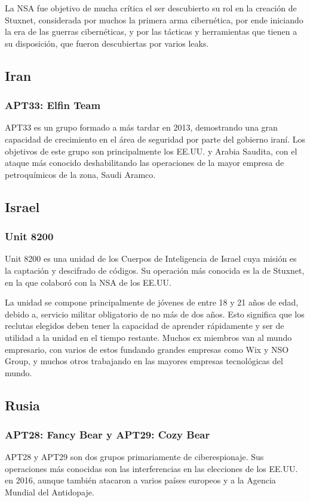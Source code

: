 \documentclass{article}
\begin{document}
La NSA fue objetivo de mucha crítica el ser descubierto su rol en la creación de Stuxnet, considerada por muchos la primera arma cibernética, por ende iniciando la era de las guerras cibernéticas, y por las tácticas y herramientas que tienen a su disposición, que fueron descubiertas por varios leaks.

\subsection{Iran}
\subsubsection{APT33: Elfin Team}
APT33 es un grupo formado a más tardar en 2013, demostrando una gran capacidad de crecimiento en el área de seguridad por parte del gobierno iraní. Los objetivos de este grupo son principalmente los EE.UU. y Arabia Saudita, con el ataque más conocido deshabilitando las operaciones de la mayor empresa de petroquímicos de la zona, Saudi Aramco.

\subsection{Israel}
\subsubsection{Unit 8200}
Unit 8200 es una unidad de los Cuerpos de Inteligencia de Israel cuya misión es la captación y descifrado de códigos. Su operación más conocida es la de Stuxnet, en la que colaboró con la NSA de los EE.UU.

La unidad se compone principalmente de jóvenes de entre 18 y 21 años de edad, debido a, servicio militar obligatorio de no más de dos años. Esto significa que los reclutas elegidos deben tener la capacidad de aprender rápidamente y ser de utilidad a la unidad en el tiempo restante. Muchos ex miembros van al mundo empresario, con varios de estos fundando grandes empresas como Wix y NSO Group, y muchos otros trabajando en las mayores empresas tecnológicas del mundo.

\subsection{Rusia}
\subsubsection{APT28: Fancy Bear y APT29: Cozy Bear}
APT28 y APT29 son dos grupos primariamente de ciberespionaje. Sus operaciones más conocidas son las interferencias en las elecciones de los EE.UU. en 2016, aunque también atacaron a varios países europeos y a la Agencia Mundial del Antidopaje.
\end{document}
